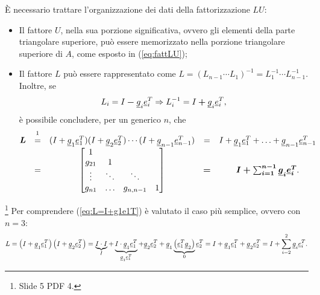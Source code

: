 È necessario trattare l'organizzazione dei dati della fattorizzazione $LU$: 
\begin{itemize}
    \item Il fattore $U$, nella sua porzione significativa, ovvero gli elementi della parte triangolare superiore, può essere memorizzato nella porzione triangolare superiore di $A$, come esposto in (\ref{eq:fattLU});
    \item Il fattore $L$ può essere rappresentato come $L=(L_{n-1}\cdots L_1)^{-1}=L_1^{-1}\cdots L_{n-1}^{-1}$.
    Inoltre, se
    \begin{equation*}
        L_i=I\boldsymbol - \uline g_i\uline e_i^T\Rightarrow L_i^{-1}=I\boldsymbol + \uline g_i\uline e_i^T,
    \end{equation*}
    è possibile concludere, per un generico $n$, che
    \begin{equation}\label{eq:L=I+g1e1T}
        \begin{matrix}
            \boldsymbol L &\overset{\footnotemark}{=}& (I+\uline g_1 \uline e_1^T)(I+\uline g_2 \uline e_2^T)\cdots(I+\uline g_{n-1} \uline e_{n-1}^T) &=& I + \uline g_1 \uline e_1^T +\hdots + \uline g_{n-1} \uline e_{n-1}^T \\
            &=& \begin{bmatrix}
            1 & & &\\
            g_{21} & 1 & & \\
            \vdots & \ddots & \ddots\\
            g_{n1} & \hdots & g_{n,n-1} & 1
        \end{bmatrix}&\boldsymbol =& \boldsymbol{I+\sum_{i=1}^{n-1}\uline g_i \uline e_i^T}.
        \end{matrix}
    \end{equation}
\end{itemize}

\begin{example}\footnote{Slide 5 PDF 4.}
    Per comprendere (\ref{eq:L=I+g1e1T}) è valutato il caso più semplice, ovvero con $n=3$:
    \begin{equation*}
        L=\left(I+\uline g_1 \uline e_1^T\right)\left(I+\uline g_2\uline e_2^T\right) = \underbrace{I\cdot I}_{I}+\underbrace{I\cdot \uline g_1 \uline e_1^T}_{\uline g_1 \uline e_1^T}+ \uline g_2 \uline e_2^T + \uline g_1 \underbrace{\left(\uline e_1^T \uline g_2\right)}_{0} \uline e_2^T = I+\uline g_1\uline e_1^T + \uline g_2 \uline e_2^T = I + \sum_{i=2}^2\uline g_i \uline e_i^T.
    \end{equation*}
\end{example}

